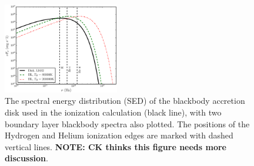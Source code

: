 \documentclass[preprint, a4paper, 11pt]{aastex}
\begin{document}
\begin{figure}
\centering
\includegraphics[width=0.45\textwidth]{figures/sed_figure.eps}
\caption{
The spectral energy distribution (SED) of the blackbody accretion
disk used in the ionization calculation (black line), 
with two boundary layer blackbody spectra also plotted.
The positions of the Hydrogen and Helium ionization edges 
are marked with dashed vertical lines.
{\bf NOTE: CK thinks this figure needs more discussion}.
}
\label{sed}
\end{figure}


%



%

%
%
\end{document}

